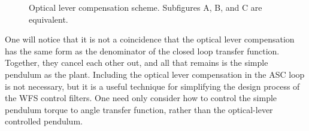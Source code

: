\begin{figure} 
\begin{centering} 
  
\caption[Optical lever compensation scheme]{Optical lever compensation scheme. Subfigures A, B, and C are equivalent.}  
\label{fig:OLcomp} 
\end{centering} 
\end{figure}

One will notice that it is not a coincidence that the optical lever compensation has the same form as the denominator of the closed loop transfer function. Together, they cancel each other out, and all that remains is the simple pendulum as the plant. Including the optical lever compensation in the ASC loop is not necessary, but it is a useful technique for simplifying the design process of the WFS control filters. One need only consider how to control the simple pendulum torque to angle transfer function, rather than the optical-lever controlled pendulum.










